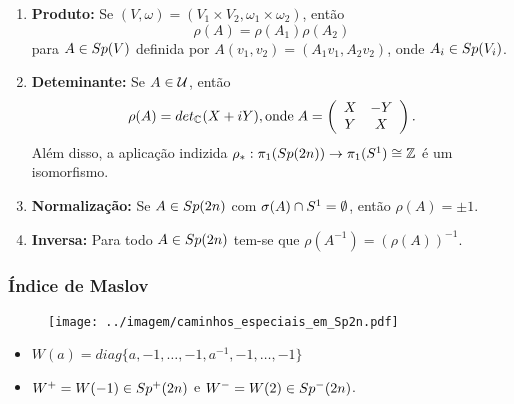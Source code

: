 \documentclass{beamer}
\begin{document}
\begin{footnotesize}
\begin{frame}
\begin{scriptsize}
\begin{enumerate}
				\item \textbf{Produto:} Se $(V,\omega) = (V_{1}\times V_{2},\omega_{1}\times \omega_{2})$, então
				$$
				\rho(A) = \rho(A_{1})\rho(A_{2})
				$$
				para $A\in Sp(V)$ definida por $A(v_{1}, v_{2})=(A_{1}v_{1}, A_{2}v_{2})$, onde $A_{i} \in Sp(V_{i})$.
			
			
			\item \textbf{Deteminante:} Se $A\in \mathcal{U}$, então 
			$$
			\rho(A) = det_{\mathbb{C}^{}}(X+iY), \text{onde} \;	
			A=\left(
			\begin{array}{cc}
			X & -Y					\\
			Y & X
			\end{array}
			\right).
			$$
			Além disso, a aplicação indizida $\rho_{*}: \pi_{1}(Sp(2n)) \to \pi_{1}(S^{1}) \cong \mathbb{Z}$ é um isomorfismo.
			
			\item \textbf{Normalização:} Se $A \in Sp(2n)$ com $\sigma(A)\cap S^{1} = \emptyset$, então $\rho(A) = \pm 1$.
			
			
			\item  \textbf{Inversa:} Para todo $A \in Sp(2n)$ tem-se que $\rho(A^{-1})=(\rho(A))^{-1}$. 
			
			\end{enumerate}
		\end{scriptsize}
	\end{frame}
	
		\begin{frame}
			\frametitle{Índice de Maslov}
			\begin{minipage}[t]{0.5\linewidth}
				\begin{figure}[!h]
					\centering
					\texttt{[image: ../imagem/caminhos\_especiais\_em\_Sp2n.pdf]}
				\end{figure}
			\end{minipage}
			\hfill%
			\begin{minipage}[t]{0.3\linewidth}
				
				
			\end{minipage}
			
			\begin{scriptsize}
				\begin{itemize}
					\item $W(a) = diag\{a,-1,\dots,-1, a^{-1},-1,\dots,-1\}$
					\item $W^{+}=W(-1) \in  Sp^{+}(2n)$
					e 
					$W^{-} = W(2)\in Sp^{-}(2n)$.
				\end{itemize}
				

\end{scriptsize}
\end{frame}
\end{footnotesize}
\end{document}
